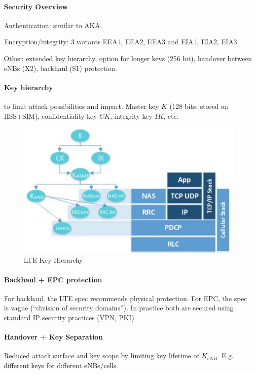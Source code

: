 \paragraph{Security Overview}
Authentication: similar to AKA.

Encryption/integrity: 3 variants EEA1, EEA2, EEA3 and EIA1, EIA2, EIA3.

Other: extended key hierarchy, option for longer keys (256 bit), handover between eNBs (X2), backhaul (S1) protection.

\paragraph{Key hierarchy}
to limit attack possibilities and impact.
Master key $K$ (128 bits, stored on HSS+SIM), confidentiality key $CK$, integrity key $IK$, etc.
\begin{figure}
	\centering
	\includegraphics[scale=0.5]{images/10-4g-key-hierarchy.png}
	\caption{LTE Key Hierarchy}
	\label{fig:4g-key-hierarchy}
\end{figure}

\paragraph{Backhaul + EPC protection}
For backhaul, the LTE spec recommends physical protection.
For EPC, the spec is vague (``division of security domains'').
In practice both are secured using standard IP security practices (VPN, PKI).

\paragraph{Handover + Key Separation}
Reduced attack surface and key scope by limiting key lifetime of $K_{eNB}$.
E.g. different keys for different eNBs/cells.

